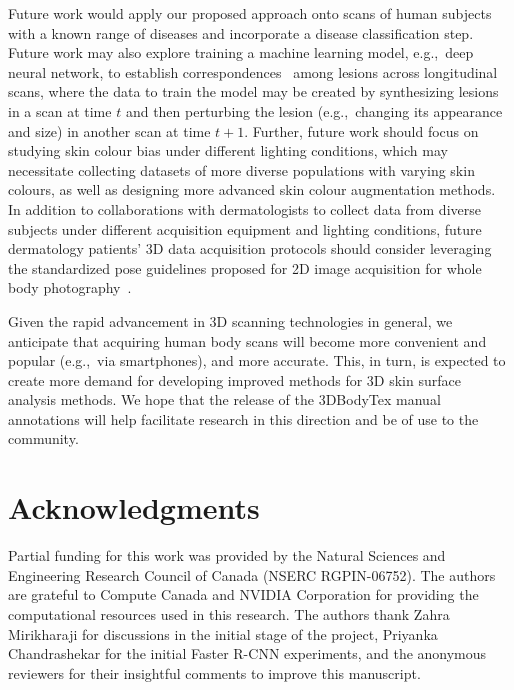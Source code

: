 \documentclass[journal]{IEEEtran}
\def\eg{e.g.,~}
\begin{document}
Future work would apply our proposed approach onto scans of human subjects with a known range of diseases and incorporate a disease classification step. Future work may also explore training a machine learning model, \eg deep neural network, to establish correspondences~\citep{Yi2018} among lesions across longitudinal scans, where the data to train the model may be created by synthesizing lesions in a scan at time $t$ and then perturbing the lesion (\eg changing its appearance and size) in another scan at time $t+1$. Further, future work should focus on studying skin colour bias under different lighting conditions, which may necessitate collecting datasets of more diverse populations with varying skin colours, as well as designing more advanced skin colour augmentation methods. In addition to collaborations with dermatologists to collect data from diverse subjects under different acquisition equipment and lighting conditions, future dermatology patients’ 3D data acquisition protocols should consider leveraging the standardized pose guidelines proposed for 2D image acquisition for whole body photography~\citep{Halpern2003}.

Given the rapid advancement in 3D scanning technologies in general, we anticipate that acquiring human body scans will become more convenient and popular (\eg via smartphones), and more accurate. This, in turn, is expected to create more demand for developing improved methods for 3D skin surface analysis methods. We hope that the release of the 3DBodyTex manual annotations will help facilitate research in this direction and be of use to the community.

\section*{Acknowledgments}
Partial funding for this work was provided by the Natural Sciences and Engineering Research Council of Canada (NSERC RGPIN-06752). The authors are grateful to Compute Canada and NVIDIA Corporation for providing the computational resources used in this research. The authors thank Zahra Mirikharaji for discussions in the initial stage of the project, Priyanka Chandrashekar for the initial Faster R-CNN experiments, and the anonymous reviewers for their insightful comments to improve this manuscript.

%
\footnotesize{

{}
}
\end{document}
